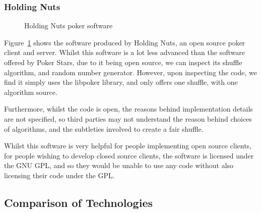 \subsubsection{Holding Nuts}

\begin{figure}[H]
    \caption{Holding Nuts poker software}%
    \label{fig:holdingnuts}
\end{figure}

Figure~\ref{fig:holdingnuts} shows the software produced by Holding Nuts, an
open source poker client and server. Whilst this software is a lot less
advanced than the software offered by Poker Stars, due to it being open source,
we can inspect its shuffle algorithm, and random number generator. However,
upon inspecting the code, we find it simply uses the libpoker \parencite{code:dachary2004}
library, and only offers one shuffle, with one algorithm source.

Furthermore, whilst the code is open, the reasons behind implementation details
are not specified, so third parties may not understand the reason behind choices
of algorithms, and the subtleties involved to create a fair shuffle.

Whilst this software
is very helpful for people implementing open source clients, for people wishing
to develop closed source clients, the software is licensed under the GNU
GPL, and so they would be unable to use any code without also licensing their
code under the GPL\@.

\subsection{Comparison of Technologies}

